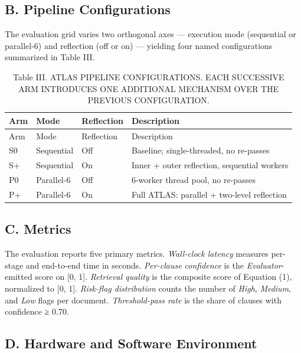 \documentclass[
  twocolumn]{article}
\begin{document}
\subsection{B. Pipeline
Configurations}\label{b.-pipeline-configurations}

The evaluation grid varies two orthogonal axes --- execution mode
(sequential or parallel-6) and reflection (off or on) --- yielding four
named configurations summarized in Table III.

\begin{longtable}[]{@{}llll@{}}
\caption{Table III. ATLAS PIPELINE CONFIGURATIONS. EACH SUCCESSIVE ARM
INTRODUCES ONE ADDITIONAL MECHANISM OVER THE PREVIOUS
CONFIGURATION.}\tabularnewline
\toprule\noalign{}
Arm & Mode & Reflection & Description \\
\midrule\noalign{}
\endfirsthead
\toprule\noalign{}
Arm & Mode & Reflection & Description \\
\midrule\noalign{}
\endhead
\bottomrule\noalign{}
\endlastfoot
S0 & Sequential & Off & Baseline; single-threaded, no re-passes \\
S+ & Sequential & On & Inner + outer reflection, sequential workers \\
P0 & Parallel-6 & Off & 6-worker thread pool, no re-passes \\
P+ & Parallel-6 & On & Full ATLAS: parallel + two-level reflection \\
\end{longtable}

\subsection{C. Metrics}\label{c.-metrics}

The evaluation reports five primary metrics. \emph{Wall-clock latency}
measures per-stage and end-to-end time in seconds. \emph{Per-clause
confidence} is the \emph{Evaluator}-emitted score on {[}0, 1{]}.
\emph{Retrieval quality} is the composite score of Equation (1),
normalized to {[}0, 1{]}. \emph{Risk-flag distribution} counts the
number of \emph{High}, \emph{Medium}, and \emph{Low} flags per document.
\emph{Threshold-pass rate} is the share of clauses with confidence ≥
0.70.

\subsection{D. Hardware and Software
Environment}\label{d.-hardware-and-software-environment}
\end{document}
